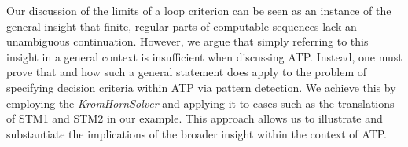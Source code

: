 \documentclass[%
  manuscript=article,   %
  year=2024,
  volume=77,
  doi=00000.000,
]{zfn}
\begin{document}
Our discussion of the limits of a loop criterion can be seen as an instance of the general insight that finite, regular parts of computable sequences lack an unambiguous continuation. However, we argue that simply referring to this insight in a general context is insufficient when discussing ATP. Instead, one must prove that and how such a general statement does apply to the problem of specifying decision criteria within ATP via pattern detection. We achieve this by employing the \emph{KromHornSolver} and applying it to cases such as the translations of STM1 and STM2 in our example. This approach allows us to illustrate and substantiate the implications of the broader insight within the context of ATP.



\printbibliography
\end{document}
